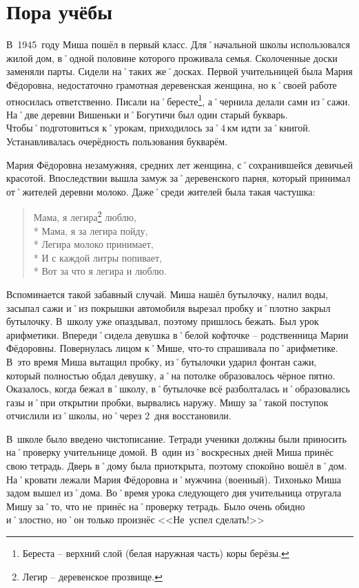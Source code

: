 ﻿\chapter{Пора учёбы}
В~1945~году Миша пошёл в первый класс. Для˚начальной школы использовался жилой дом, в˚одной половине которого проживала семья. Сколоченные доски заменяли парты. Сидели на˚таких же˚досках. Первой учительницей была Мария Фёдоровна, недостаточно грамотная деревенская женщина, но к˚своей работе относилась ответственно. Писали на˚бересте\footnote{Береста \--- верхний слой (белая наружная часть) коры берёзы.}, а˚чернила делали сами из˚сажи. На˚две деревни Вишеньки и˚Богутичи был один старый букварь. Чтобы˚подготовиться к˚урокам, приходилось за˚4\,км идти за˚книгой. Устанавливалась очерёдность пользования букварём.

Мария Фёдоровна незамужняя, средних лет женщина, с˚сохранившейся девичьей красотой. Впоследствии вышла замуж за˚деревенского парня, который принимал от˚жителей деревни молоко. Даже˚среди жителей была такая частушка:

\begin{verse}
	Мама, я легира\footnote{Легир \--- деревенское прозвище.} люблю, \\* 
	Мама, я за легира пойду, \\*	
	Легира молоко принимает, \\*
	И с каждой литры попивает, \\*
	Вот за что я легира и люблю. 
\end{verse}

Вспоминается такой забавный случай. Миша нашёл бутылочку, налил воды, засыпал сажи и˚из покрышки автомобиля вырезал пробку и˚плотно закрыл бутылочку. В~школу уже опаздывал, поэтому пришлось бежать. Был урок арифметики. Впереди˚сидела девушка в˚белой кофточке \--- родственница Марии Фёдоровны. Повернулась лицом к˚Мише, что-то спрашивала по˚арифметике. В~это время Миша вытащил пробку, из˚бутылочки ударил фонтан сажи, который полностью обдал девушку, а˚на потолке образовалось чёрное пятно. Оказалось, когда бежал в˚школу, в˚бутылочке всё разболталась и˚образовались газы и˚при открытии пробки, вырвались наружу. Мишу за˚такой поступок отчислили из˚школы, но˚через 2~дня восстановили.

В~школе было введено чистописание. Тетради ученики должны были приносить на˚проверку учительнице домой. В~один из˚воскресных дней Миша принёс свою тетрадь. Дверь в˚дому была приоткрыта, поэтому спокойно вошёл в˚дом. На˚кровати лежали Мария Фёдоровна и˚мужчина (военный). Тихонько Миша задом вышел из˚дома. Во˚время урока следующего дня учительница отругала Мишу за˚то, что не~принёс на˚проверку тетрадь. Было очень обидно и˚злостно, но˚он только произнёс <<Не~успел сделать!>> 

